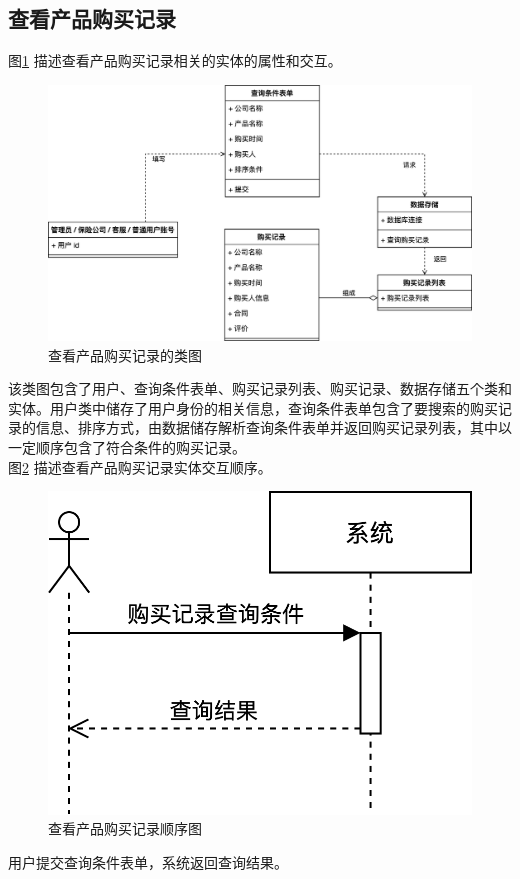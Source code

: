 \documentclass[a4paper]{ctexart}
\begin{document}
\subsection{查看产品购买记录}

图\ref{fig:查看产品购买记录类图} 描述查看产品购买记录相关的实体的属性和交互。
\begin{figure}[H]
\centering
\includegraphics[scale=0.3]{image/4_6类图.png}
\caption{查看产品购买记录的类图}
\label{fig:查看产品购买记录类图}
\end{figure}
该类图包含了用户、查询条件表单、购买记录列表、购买记录、数据存储五个类和实体。用户类中储存了用户身份的相关信息，查询条件表单包含了要搜索的购买记录的信息、排序方式，由数据储存解析查询条件表单并返回购买记录列表，其中以一定顺序包含了符合条件的购买记录。\\

图\ref{fig:查看产品购买记录顺序图} 描述查看产品购买记录实体交互顺序。
\begin{figure}[H]
\centering
\includegraphics[scale=0.2]{image/4_7顺序图.png}
\caption{查看产品购买记录顺序图}
\label{fig:查看产品购买记录顺序图}
\end{figure}
用户提交查询条件表单，系统返回查询结果。\\
\end{document}
